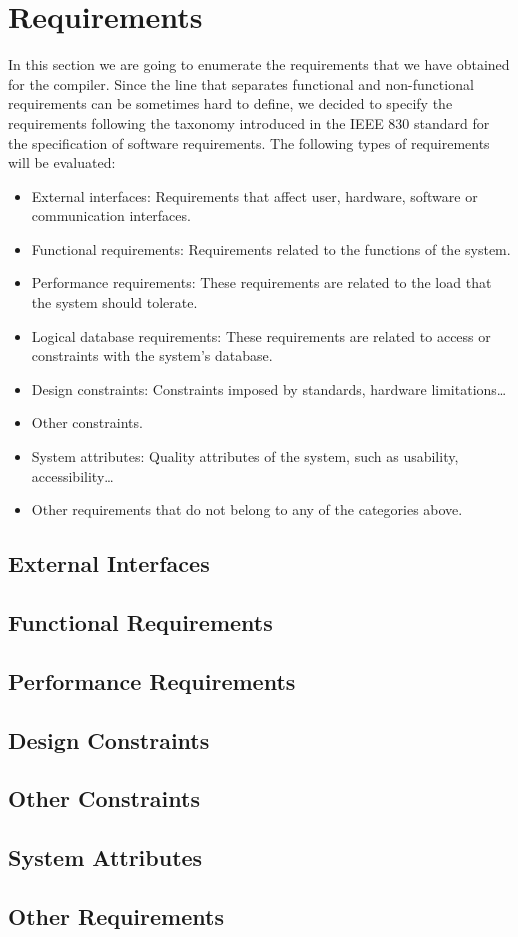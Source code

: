 \section{Requirements}

In this section we are going to enumerate the requirements that we have obtained for the
compiler. Since the line that separates functional and non-functional requirements can be
sometimes hard to define, we decided to specify the requirements following the taxonomy
introduced in the IEEE 830 standard for the specification of software requirements. The
following types of requirements will be evaluated:

\begin{itemize}
    \item External interfaces: Requirements that affect user, hardware, software or communication interfaces.
    \item Functional requirements: Requirements related to the functions of the system.
    \item Performance requirements: These requirements are related to the load that the system should tolerate.
    \item Logical database requirements: These requirements are related to access or constraints with the system’s database.
    \item Design constraints: Constraints imposed by standards, hardware limitations…
    \item Other constraints.
    \item System attributes: Quality attributes of the system, such as usability, accessibility…
    \item Other requirements that do not belong to any of the categories above.
\end{itemize}

\subsection{External Interfaces}

\subsection{Functional Requirements}

\subsection{Performance Requirements}

\subsection{Design Constraints}

\subsection{Other Constraints}

\subsection{System Attributes}

\subsection{Other Requirements}

